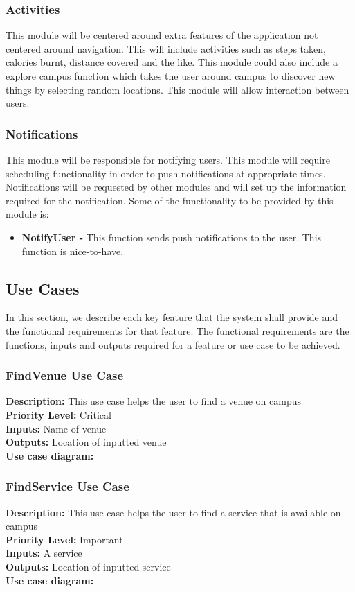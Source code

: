 \documentclass[a4paper,12pt]{article}
\begin{document}
\subsubsection{Activities}
This module will be centered around extra features of the application not centered around navigation. This will include activities such as steps taken, calories burnt, distance covered and the like. This module could also include a explore campus function which takes the user around campus to discover new things by selecting random locations. This module will allow interaction between users.
 
\subsubsection{Notifications}
This module will be responsible for notifying users. This module will require scheduling functionality in order to push notifications at appropriate times. Notifications will be requested by other modules and will set up the information required for the notification. Some of the functionality to be provided by this module is:
\begin{itemize}
\item \textbf{NotifyUser -} This function sends push notifications to the user. This function is nice-to-have.
\end{itemize}

\subsection{Use Cases}
In this section, we describe each key feature that the system shall provide and the functional requirements for that feature. The functional requirements are the functions, inputs and outputs required for a feature or use case to be achieved. 
\subsubsection{FindVenue Use Case}
\textbf{Description: } This use case helps the user to find a venue on campus\\
\textbf{Priority Level: } Critical\\
\textbf{Inputs:} Name of venue\\
\textbf{Outputs:} Location of inputted venue\\
\textbf{Use case diagram: }\\

\subsubsection{FindService Use Case}
\textbf{Description: } This use case helps the user to find a service that is available on campus\\
\textbf{Priority Level:} Important\\
\textbf{Inputs:} A service\\
\textbf{Outputs:} Location of inputted service\\
\textbf{Use case diagram: }\\
\end{document}
